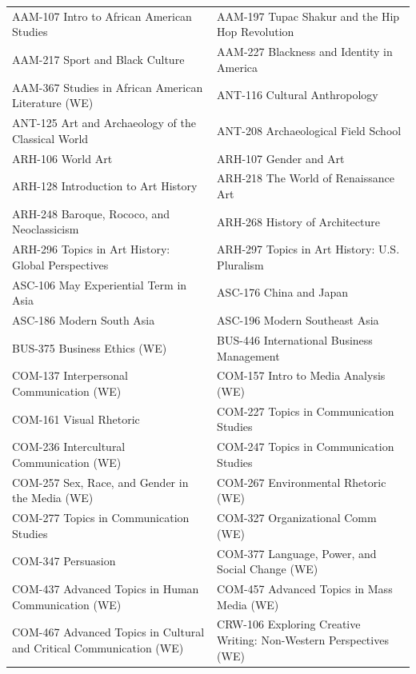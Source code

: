 \documentclass[
  letterpaper,
]{scrbook}
\renewcommand\toprule[2]\relax
\renewcommand\bottomrule[2]\relax
\newcounter{none}
\begin{document}
{\def\LTcaptype{none} %
\begin{longtable}[]{@{}
  >{\raggedright\arraybackslash}p{}
  >{\raggedright\arraybackslash}p{}@{}}
\toprule\noalign{}
\endhead
\bottomrule\noalign{}
\endlastfoot
AAM-107 Intro to African American Studies & AAM-197 Tupac Shakur and the
Hip Hop Revolution \\
AAM-217 Sport and Black Culture & AAM-227 Blackness and Identity in
America \\
AAM-367 Studies in African American Literature (WE) & ANT-116 Cultural
Anthropology \\
ANT-125 Art and Archaeology of the Classical World & ANT-208
Archaeological Field School \\
ARH-106 World Art & ARH-107 Gender and Art \\
ARH-128 Introduction to Art History & ARH-218 The World of Renaissance
Art \\
ARH-248 Baroque, Rococo, and Neoclassicism & ARH-268 History of
Architecture \\
ARH-296 Topics in Art History: Global Perspectives & ARH-297 Topics in
Art History: U.S. Pluralism \\
ASC-106 May Experiential Term in Asia & ASC-176 China and Japan \\
ASC-186 Modern South Asia & ASC-196 Modern Southeast Asia \\
BUS-375 Business Ethics (WE) & BUS-446 International Business
Management \\
COM-137 Interpersonal Communication (WE) & COM-157 Intro to Media
Analysis (WE) \\
COM-161 Visual Rhetoric & COM-227 Topics in Communication Studies \\
COM-236 Intercultural Communication (WE) & COM-247 Topics in
Communication Studies \\
COM-257 Sex, Race, and Gender in the Media (WE) & COM-267 Environmental
Rhetoric (WE) \\
COM-277 Topics in Communication Studies & COM-327 Organizational Comm
(WE) \\
COM-347 Persuasion & COM-377 Language, Power, and Social Change (WE) \\
COM-437 Advanced Topics in Human Communication (WE) & COM-457 Advanced
Topics in Mass Media (WE) \\
COM-467 Advanced Topics in Cultural and Critical Communication (WE) &
CRW-106 Exploring Creative Writing: Non-Western Perspectives (WE) \\

\end{longtable}}
\end{document}
